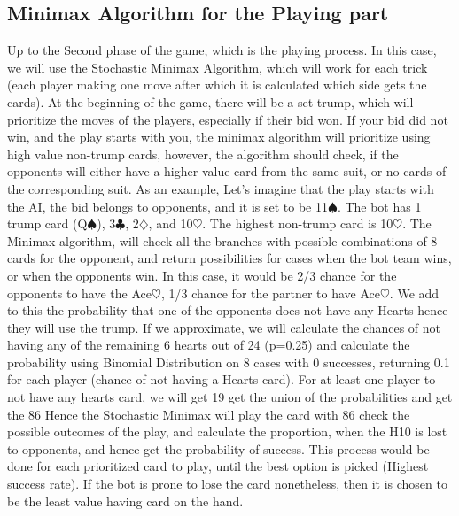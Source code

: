 \subsection{Minimax Algorithm for the Playing part}
\hspace{\parindent} Up to the Second phase of the game, which is the playing process.
In this case, we will use
the Stochastic Minimax Algorithm, which will work for each trick (each player making one
move after which it is calculated which side gets the cards). At the beginning of the
game, there will be a set trump, which will prioritize the moves of the players,
especially if their bid won. If your bid did not win, and the play starts with you,
the minimax algorithm will prioritize using high value non-trump cards, however, the
algorithm should check, if the opponents will either have a higher value card from the
same suit, or no cards of the corresponding suit. As an example, Let’s imagine that the
play starts with the AI, the bid belongs to opponents, and it is set to be 11$\spadesuit$.
The bot has 1 trump card (Q$\spadesuit$), 3$\clubsuit$, 2$\diamondsuit$, and 10$\heartsuit$. The highest
non-trump card is 10$\heartsuit$. The Minimax algorithm, will check all the branches with
possible combinations of 8 cards for the opponent, and return possibilities for cases
when the bot team wins, or when the opponents win. In this case, it would be 2/3 chance
for the opponents to have the Ace$\heartsuit$, 1/3 chance for the partner to have Ace$\heartsuit$. We add
to this the probability that one of the opponents does not have any Hearts hence they
will use the trump. If we approximate, we will calculate the chances of not having any
of the remaining 6 hearts out of 24 (p=0.25) and calculate the probability using Binomial
Distribution on 8 cases with 0 successes, returning 0.1 for each player (chance of not
having a Hearts card). For at least one player to not have any hearts card, we will get
19%
get the union of the probabilities and get the 86%
Hence the Stochastic Minimax will play
the card with 86%
check the possible outcomes of the play, and calculate the proportion, when the H10 is
lost to opponents, and hence get the probability of success. This process would be done
for each prioritized card to play, until the best option is picked (Highest success rate).
If the bot is prone to lose the card nonetheless, then it is chosen to be the least value
having card on the hand.